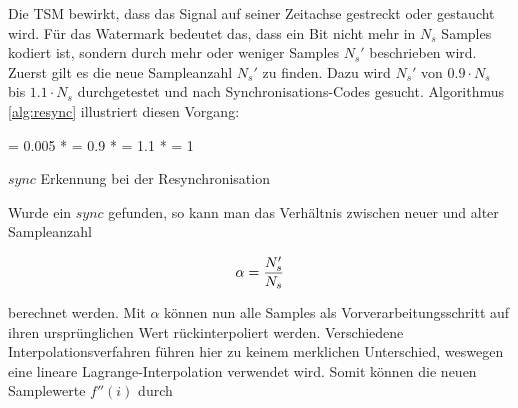 Die TSM bewirkt, dass das Signal auf seiner Zeitachse gestreckt oder gestaucht wird. Für das Watermark bedeutet das, dass ein Bit nicht mehr in $N_s$ Samples kodiert ist, sondern durch mehr oder weniger Samples ${N}_{s}'$ beschrieben wird. 
Zuerst gilt es die neue Sampleanzahl ${N}_{s}'$ zu finden. Dazu wird ${N}_{s}'$ von $0.9 \cdot {N}_{s}$ bis $1.1 \cdot {N}_{s}$ durchgetestet und nach Synchronisations-Codes gesucht. Algorithmus \ref{alg:resync} illustriert diesen Vorgang:

\begin{algorithm}[h]


\BlankLine

\Steplen = 0.005 * \Ns\;
\Lowerbound = 0.9 * \Ns\;
\Upperbound = 1.1 * \Ns\;
\Cursor = 1\;


\caption{$sync$ Erkennung bei der Resynchronisation}
\label{alg:resync}
\end{algorithm}

Wurde ein $sync$ gefunden, so kann man das Verhältnis zwischen neuer und alter Sampleanzahl

	\begin{equation}
		\alpha = { {N}_{s}' \over {N}_{s} }
		\label{equ:resampling_factor}
	\end{equation}

berechnet werden. Mit $\alpha$ können nun alle Samples als Vorverarbeitungsschritt auf ihren ursprünglichen Wert rückinterpoliert werden. Verschiedene Interpolationsverfahren führen hier zu keinem merklichen Unterschied\cite{xiang2007robust}, weswegen eine lineare Lagrange-Interpolation verwendet wird. Somit können die neuen Samplewerte $f''(i)$ durch

